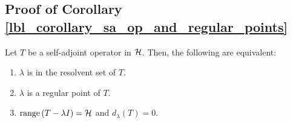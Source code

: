 \subsection{Proof of Corollary \eqref{lbl_corollary_sa_op_and_regular_points}}\label{proof_lbl_corollary_sa_op_and_regular_points}

\begin{corollary}
  Let $T$ be a self-adjoint operator in $\mathcal{H}$. Then, the following are equivalent:
  \begin{enumerate}[label = (\alph*)]
    \item $\lambda$ is in the resolvent set of $T$.
    \item $\lambda$ is a regular point of $T$.
    \item $\operatorname{range}\left(T - \lambda I\right) = \mathcal{H}$ and $d_\lambda (T) = 0$.
  \end{enumerate}
\end{corollary}
